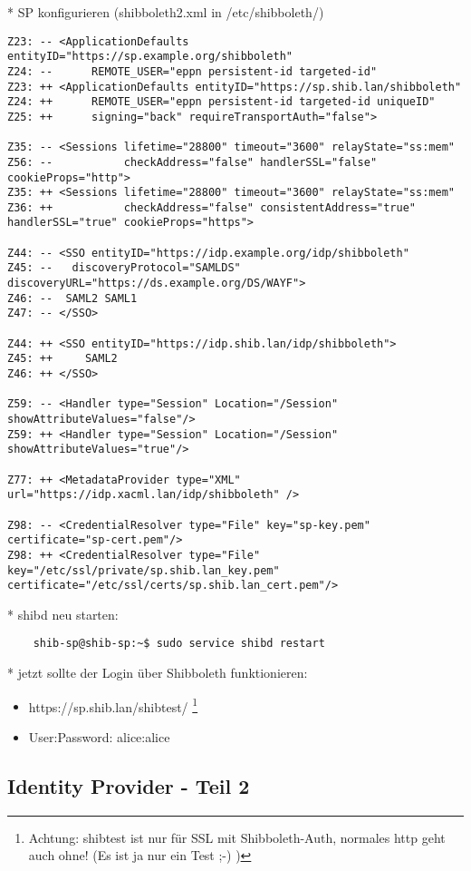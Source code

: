* SP konfigurieren (shibboleth2.xml  in /etc/shibboleth/)
\begin{lstlisting}
Z23: -- <ApplicationDefaults entityID="https://sp.example.org/shibboleth"
Z24: --      REMOTE_USER="eppn persistent-id targeted-id"
Z23: ++ <ApplicationDefaults entityID="https://sp.shib.lan/shibboleth"
Z24: ++      REMOTE_USER="eppn persistent-id targeted-id uniqueID"
Z25: ++      signing="back" requireTransportAuth="false">

Z35: -- <Sessions lifetime="28800" timeout="3600" relayState="ss:mem"
Z56: --           checkAddress="false" handlerSSL="false" cookieProps="http">
Z35: ++ <Sessions lifetime="28800" timeout="3600" relayState="ss:mem"
Z36: ++           checkAddress="false" consistentAddress="true" handlerSSL="true" cookieProps="https">

Z44: -- <SSO entityID="https://idp.example.org/idp/shibboleth"
Z45: --   discoveryProtocol="SAMLDS" discoveryURL="https://ds.example.org/DS/WAYF">
Z46: --  SAML2 SAML1
Z47: -- </SSO>

Z44: ++ <SSO entityID="https://idp.shib.lan/idp/shibboleth">
Z45: ++ 	SAML2 
Z46: ++ </SSO>

Z59: -- <Handler type="Session" Location="/Session" showAttributeValues="false"/>
Z59: ++ <Handler type="Session" Location="/Session" showAttributeValues="true"/>

Z77: ++ <MetadataProvider type="XML" url="https://idp.xacml.lan/idp/shibboleth" />

Z98: -- <CredentialResolver type="File" key="sp-key.pem" certificate="sp-cert.pem"/>
Z98: ++ <CredentialResolver type="File" key="/etc/ssl/private/sp.shib.lan_key.pem" certificate="/etc/ssl/certs/sp.shib.lan_cert.pem"/>
\end{lstlisting}

* shibd neu starten:
\begin{lstlisting}
	shib-sp@shib-sp:~$ sudo service shibd restart
\end{lstlisting}
* jetzt sollte der Login über Shibboleth funktionieren: 
\begin{itemize}
\item https://sp.shib.lan/shibtest/ \footnote{Achtung: shibtest ist nur für SSL mit Shibboleth-Auth, normales http geht auch ohne! (Es ist ja nur ein Test ;-) )}
\item User:Password: alice:alice
\end{itemize}

\subsection{Identity Provider - Teil 2}
